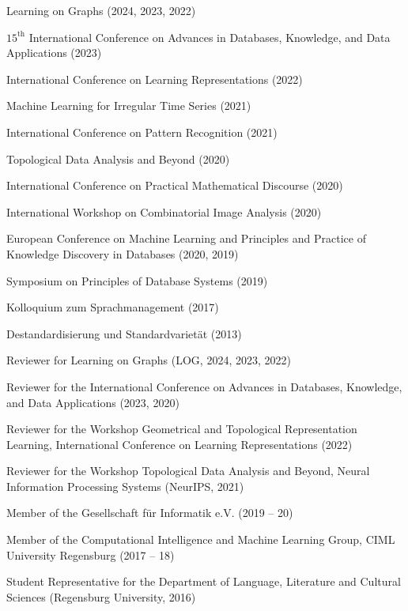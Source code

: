 \documentclass[a4paper, 12pt]{article}
\newcommand{\years}[1]{\marginnote{\scriptsize #1}}
\begin{document}
	\years{Conferences}
	\vspace{-10pt}
	\begin{etaremune}[itemsep=-5pt, leftmargin=15pt]
		\item Learning on Graphs (2024, 2023, 2022)
		\item $15^{\text{th}}$ International Conference on Advances in Databases, Knowledge, and Data Applications (2023)
		\item International Conference on Learning Representations (2022)
		\item Machine Learning for Irregular Time Series (2021)
		\item International Conference on Pattern Recognition (2021)
		\item Topological Data Analysis and Beyond (2020)
		\item International Conference on Practical Mathematical Discourse (2020)
		\item International Workshop on Combinatorial Image Analysis (2020)
		\item European Conference on Machine Learning and Principles and Practice of Knowledge Discovery in Databases (2020, 2019)
		\item Symposium on Principles of Database Systems (2019)
		\item Kolloquium zum Sprachmanagement (2017)
		\item Destandardisierung und Standardvarietät (2013)
	\end{etaremune}
	\vspace{10pt}

	\years{Service}
	\vspace{-10pt}
	\begin{etaremune}[itemsep=-5pt, leftmargin=15pt]
		\item Reviewer for Learning on Graphs (LOG, 2024, 2023, 2022)
		\item Reviewer for the International Conference on Advances in Databases, Knowledge, and Data Applications (2023, 2020)
		\item Reviewer for the Workshop Geometrical and Topological Representation Learning, International Conference on Learning Representations (2022)
		\item Reviewer for the Workshop Topological Data Analysis and Beyond, Neural Information Processing Systems (NeurIPS, 2021)
		\item Member of the Gesellschaft für Informatik e.V. (2019 -- 20)
		\item Member of the Computational Intelligence and Machine Learning Group, CIML University Regensburg (2017 -- 18)
		\item Student Representative for the Department of Language, Literature and Cultural Sciences (Regensburg University, 2016)
	\end{etaremune}
	\vspace{10pt}
\end{document}
